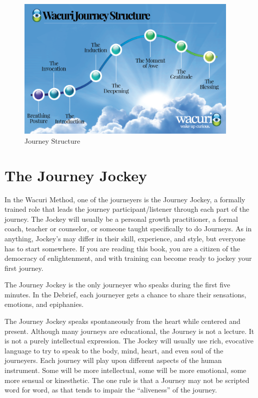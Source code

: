\documentclass[12pt]{book}
\begin{document}
\begin{figure}
  \centering
     \includegraphics[width=0.95\textwidth]{WacuriFigures/Wacuri-Journey-Structure4.png}
     \caption{Journey Structure}
  \label{fig:journey}     
\end{figure}



\section{The Journey Jockey}

In the Wacuri Method, one of the journeyers is the Journey Jockey, a
formally trained role that leads the journey participant/listener through each part of the journey. The Jockey will usually be a
personal growth practitioner,
a formal coach, teacher or counselor, or someone taught specifically to do Journeys. As in
anything, Jockey’s may differ in their skill, experience, and style,
but everyone has to start somewhere. If you are reading this book, you
are a citizen of the democracy of enlightenment, and with training can
become ready to jockey your first journey.
					
The Journey Jockey is the only journeyer who speaks during the first
five minutes. In the Debrief, each journeyer gets a chance to share
their sensations, emotions, and epiphanies.
					
The Journey Jockey speaks spontaneously from the heart while centered
and present.   Although many journeys are
educational, the Journey is not a lecture. It is not a purely
intellectual expression. The Jockey will usually use rich, evocative
language to try to speak to the body, mind, heart, and even soul of
the journeyers. Each journey will play upon different aspects of the
human instrument. Some will be more intellectual, some will be more
emotional, some more sensual or kinesthetic. The one rule is that a Journey may not
be scripted word for word, as that tends to impair the ``aliveness'' of the journey.
					
\end{document}
